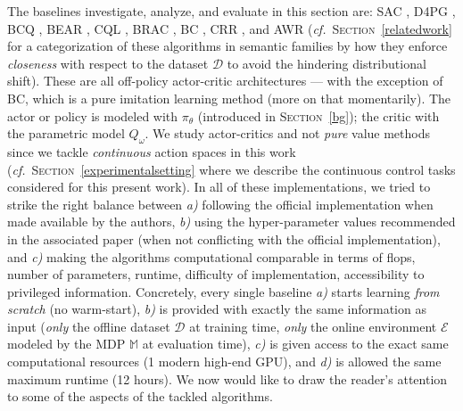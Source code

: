 The baselines investigate, analyze, and evaluate in this section are:
SAC \cite{Haarnoja2018-bm},
D4PG \cite{Barth-Maron2018-ot},
BCQ \cite{Fujimoto2018-mj},
BEAR \cite{Kumar2019-rw},
CQL \cite{Kumar2020-zb},
BRAC \cite{Wu2019-nl},
BC \cite{Pomerleau1989-nh, Pomerleau1990-lm, Ratliff2007-fc, Bagnell2015-ni},
CRR \cite{Wang2020-sr}, and
AWR \cite{Peng2019-hu}
(\textit{cf.}~\textsc{Section}~\ref{relatedwork} for a categorization of these algorithms in
semantic families by how they enforce \emph{closeness} with respect to the dataset $\mathcal{D}$
to avoid the hindering distributional shift).
These are all off-policy actor-critic \cite{Sutton1984-ce, Konda2000-ef, Konda2003-jh, Degris2012-gv}
architectures --- with the exception of BC, which is a pure imitation learning \cite{Bagnell2015-ni}
method (more on that momentarily).
The actor or policy is modeled with $\pi_\theta$ (introduced in \textsc{Section}~\ref{bg});
the critic with the parametric model $Q_\omega$.
We study actor-critics and not \textit{pure} value methods
since we tackle \emph{continuous} action spaces in this work
(\textit{cf.}~\textsc{Section}~\ref{experimentalsetting} where we describe the
continuous control tasks
considered for this present work).
In all of these implementations, we tried to strike the right balance between
\textit{a)} following the official implementation when made available by the authors,
\textit{b)} using the hyper-parameter values recommended in the associated paper (when not conflicting with
the official implementation), and
\textit{c)} making the algorithms computational comparable in terms of flops, number of parameters,
runtime, difficulty of implementation, accessibility to privileged information.
Concretely, every single baseline
\textit{a)} starts learning \emph{from scratch} (no warm-start),
\textit{b)} is provided with exactly the same information as input
(\emph{only} the offline dataset $\mathcal{D}$ at training time,
\emph{only} the online environment $\mathcal{E}$ modeled by the MDP $\mathbb{M}$ at evaluation time),
\textit{c)} is given access to the exact same computational resources (1 modern high-end GPU),
and
\textit{d)} is allowed the same maximum runtime (12 hours).
We now would like to draw the reader's attention to some of the aspects of the tackled
algorithms.

